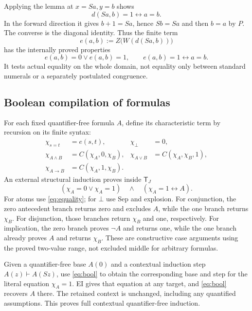 \documentclass[11pt,letterpaper]{article}
\theoremstyle{definition}\newtheorem{definition}[theorem]{Definition}
\theoremstyle{remark}\newtheorem{remark}[theorem]{Remark}
\newcommand{\TJ}{\mathsf T_J}
\begin{document}
Applying the lemma at $x=Sa,y=b$ shows
\begin{equation}
 d(Sa,b)=1\leftrightarrow a=b.\label{eq:resreflect}
\end{equation}
In the forward direction it gives $b+1=Sa$, hence $Sb=Sa$
and then $b=a$ by $P$. The converse is the diagonal identity.
Thus the finite term
\begin{equation}
 e(a,b):=Z\bigl(W(d(Sa,b))\bigr)\label{def:equality}
\end{equation}
has the internally proved properties
\begin{equation}
 e(a,b)=0\lor e(a,b)=1,\qquad e(a,b)=1\leftrightarrow a=b.
 \label{eq:equality}
\end{equation}
It tests actual equality on the whole domain, not equality only
between standard numerals or a separately postulated congruence.

\subsection{Boolean compilation of formulas}

For each fixed quantifier-free formula $A$, define its characteristic
term by recursion on its finite syntax:
\begin{align*}
 \chi_{s=t}&=e(s,t),&\chi_{\bot}&=0,\\
 \chi_{A\land B}&=C(\chi_A,0,\chi_B),&
 \chi_{A\lor B}&=C(\chi_A,\chi_B,1),\\
 \chi_{A\to B}&=C(\chi_A,1,\chi_B).
\end{align*}
An external structural induction proves inside $\TJ$
\begin{equation}
 (\chi_A=0\lor\chi_A=1)\quad\land\quad
 (\chi_A=1\leftrightarrow A).\label{eq:bool}
\end{equation}
For atoms use \eqref{eq:equality}; for $\bot$ use Sep and explosion.
For conjunction, the zero antecedent branch returns zero and excludes
$A$, while the one branch returns $\chi_B$. For disjunction, those
branches return $\chi_B$ and one, respectively. For implication, the
zero branch proves $\neg A$ and returns one, while the one branch
already proves $A$ and returns $\chi_B$. These are constructive
case arguments using the proved two-value range, not excluded middle
for arbitrary formulas.

Given a quantifier-free base $A(0)$ and a contextual induction step
$A(z)\vdash A(Sz)$, use \eqref{eq:bool} to obtain the corresponding
base and step for the literal equation $\chi_A=1$. EI gives that
equation at any target, and \eqref{eq:bool} recovers $A$ there.
The retained context is unchanged, including any quantified assumptions.
This proves full contextual quantifier-free induction.
\end{document}
